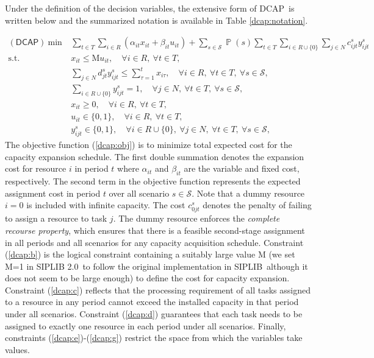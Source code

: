 \documentclass[11pt]{article}
\DeclareMathOperator*{\PP}{\mathbb{P}}
\newcommand{\siplibtwo}{\textsf{SIPLIB 2.0}}
\newcommand{\siplib}{\textsf{SIPLIB}}
\newcommand{\dcap}{\textsf{DCAP}}
\begin{document}
Under the definition of the decision variables, the extensive form of \dcap\ is written below and the summarized notation is available in Table \ref{dcap:notation}.

\begin{subequations} \label{dcap:formulation}
	\begin{align}
	(\dcap)\ \textrm{min}\ &\sum_{t\in T}\sum_{i\in R}\left(\alpha_{it}x_{it}+\beta_{it}u_{it}\right)+\sum_{s\in\mathcal{S}}\PP(s)\sum_{t\in T}\sum_{i\in R\cup\{0\}}\sum_{j\in N}c_{ijt}^{s}y_{ijt}^s	\label{dcap:obj} \\
	\textrm{s.t.}\ & x_{it}\le \textrm{M}u_{it},\quad\forall i\in R,\ \forall t\in T,	\label{dcap:b}\\
	&\sum_{j\in N}d_{jt}^s y_{ijt}^s\le\sum_{\tau=1}^{t}x_{i\tau},\quad\forall i\in R,\ \forall t\in T,\ \forall s\in\mathcal{S},\label{dcap:c}\\
	&\sum_{i\in R\cup \{0\}}y_{ijt}^s=1,\quad\forall j\in N,\ \forall t\in T,\ \forall s\in\mathcal{S}, \label{dcap:d} \\
	&x_{it}\ge 0,\quad\forall i\in R,\ \forall t\in T,\label{dcap:e} \\
	&u_{it}\in\{0,1\}, \quad\forall i\in R,\ \forall t\in T,\label{dcap:f}\\
	&y_{ijt}^s\in\{0,1\},\quad\forall i\in R\cup\{0\},\ \forall j\in N,\ \forall t\in T,\ \forall s\in\mathcal{S},\label{dcap:g}
	\end{align}
\end{subequations}
The objective function (\ref{dcap:obj}) is to minimize total expected cost for the capacity expansion schedule. The first double summation denotes the expansion cost for resource $i$ in period $t$ where $\alpha_{it}$ and $\beta_{it}$ are the variable and fixed cost, respectively. The second term in the objective function represents the expected assignment cost in period $t$ over all scenario $s\in\mathcal{S}$. Note that a dummy resource $i=0$ is included with infinite capacity. The cost $c_{0jt}^s$ denotes the penalty of failing to assign a resource to task $j$. The dummy resource enforces the \textit{complete recourse property}, which ensures that there is a feasible second-stage assignment in all periods and all scenarios for any capacity acquisition schedule. Constraint (\ref{dcap:b}) is the logical constraint containing a suitably large value M (we set M=1 in \siplibtwo\ to follow the original implementation in \siplib\, although it does not seem to be large enough) to define the cost for capacity expansion. Constraint (\ref{dcap:c}) reflects that the processing requirement of all tasks assigned to a resource in any period cannot exceed the installed capacity in that period under all scenarios. Constraint (\ref{dcap:d}) guarantees that each task needs to be assigned to exactly one resource in each period under all scenarios. Finally, constraints (\ref{dcap:e})-(\ref{dcap:g}) restrict the space from which the variables take values.
\end{document}
